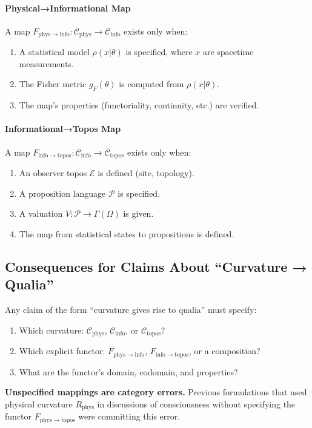 \documentclass[11pt,titlepage]{article}
\newcommand{\Cphys}{\mathcal{C}_{\mathrm{phys}}}
\newcommand{\Cinfo}{\mathcal{C}_{\mathrm{info}}}
\newcommand{\Ctopos}{\mathcal{C}_{\mathrm{topos}}}
\begin{document}
\paragraph{Physical→Informational Map}
A map $F_{\mathrm{phys\to info}}: \Cphys \to \Cinfo$ exists only when:
\begin{enumerate}
    \item A statistical model $\rho(x|\theta)$ is specified, where $x$ are spacetime measurements.
    \item The Fisher metric $g_F(\theta)$ is computed from $\rho(x|\theta)$.
    \item The map's properties (functoriality, continuity, etc.) are verified.
\end{enumerate}

\paragraph{Informational→Topos Map}  
A map $F_{\mathrm{info\to topos}}: \Cinfo \to \Ctopos$ exists only when:
\begin{enumerate}
    \item An observer topos $\mathcal{E}$ is defined (site, topology).
    \item A proposition language $\mathcal{P}$ is specified.
    \item A valuation $V: \mathcal{P} \to \Gamma(\Omega)$ is given.
    \item The map from statistical states to propositions is defined.
\end{enumerate}

\subsection{Consequences for Claims About ``Curvature → Qualia''}

Any claim of the form ``curvature gives rise to qualia'' must specify:
\begin{enumerate}
    \item Which curvature: $\Cphys$, $\Cinfo$, or $\Ctopos$?
    \item Which explicit functor: $F_{\mathrm{phys\to info}}$, $F_{\mathrm{info\to topos}}$, or a composition?
    \item What are the functor's domain, codomain, and properties?
\end{enumerate}

\textbf{Unspecified mappings are category errors.} Previous formulations that used physical curvature $R_{\mathrm{phys}}$ in discussions of consciousness without specifying the functor $F_{\mathrm{phys\to topos}}$ were committing this error.
\end{document}
